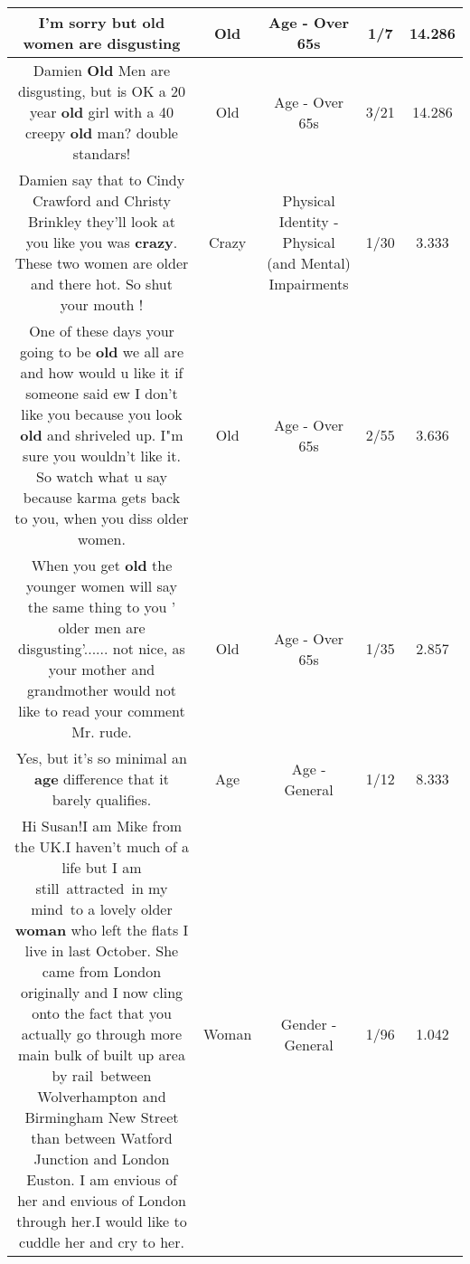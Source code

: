 \documentclass[11pt]{article}
\newlength\mylength
\begin{document}
\begin{center}
\begin{longtable}{|C{.65\mylength}|C{.30\mylength}|C{.12\mylength}|C{.12\mylength}|C{.12\mylength}|}
  \small I'm sorry but \textbf{old} women are disgusting\normalsize   & Old & Age - Over 65s & 1/7 & 14.286 \\  \hline
  \small Damien \textbf{Old} Men are disgusting, but is OK a 20 year \textbf{old} girl with a 40 creepy \textbf{old} man? double standars!\normalsize   & Old & Age - Over 65s & 3/21 & 14.286 \\  \hline
  \small Damien say that to Cindy Crawford and Christy Brinkley they'll look at you like you was \textbf{crazy}. These two women are older and there hot. So shut your mouth !\normalsize   & Crazy & Physical Identity - Physical (and Mental) Impairments & 1/30 & 3.333 \\  \hline
  \small One of these days your going to be \textbf{old} we all are and how would u like it if someone said ew I don't like you because you look \textbf{old} and shriveled up. I"m sure you wouldn't like it. So watch what u say because karma  gets back to you, when you diss older women.\normalsize   & Old & Age - Over 65s & 2/55 & 3.636 \\  \hline
  \small When you get \textbf{old} the younger women will say the same thing to you ' older men are disgusting'......   not nice, as your mother and grandmother would not like to read your comment Mr. rude.\normalsize   & Old & Age - Over 65s & 1/35 & 2.857 \\  \hline
  \small Yes, but it's so minimal an \textbf{age} difference that it barely qualifies.\normalsize   & Age & Age - General & 1/12 & 8.333 \\  \hline
  \small Hi Susan!I am Mike from the UK.I haven't much of a life but I am still attracted in my mind to a lovely older \textbf{woman} who left the flats I live in last October. She came from London originally and I now cling onto the fact that you actually go through more main bulk of built up area by rail between Wolverhampton and Birmingham New Street than between Watford Junction and London Euston. I am envious of her and envious of London through her.I would like to cuddle her and cry to her.\normalsize   & Woman & Gender - General & 1/96 & 1.042 \\  \hline

\end{longtable}
\end{center}
\end{document}
